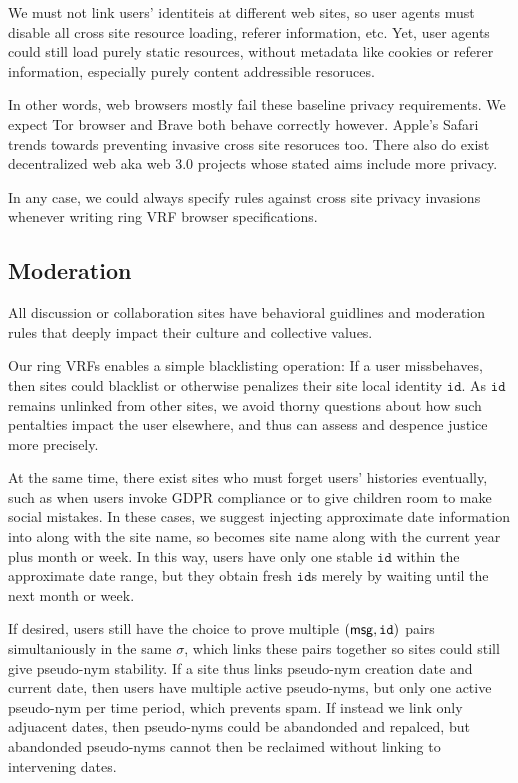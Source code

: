 We must not link users' identiteis at different web sites, so user agents
must disable all cross site resource loading, referer information, etc.
Yet, user agents could still load purely static resources, without metadata
like cookies or referer information, especially purely content addressible
resoruces.

In other words, web browsers mostly fail these baseline privacy requirements.
We expect Tor browser and Brave both behave correctly however.
Apple's Safari trends towards preventing invasive cross site resoruces too.  
There also do exist decentralized web aka web 3.0 projects whose stated aims
include more privacy.

In any case, we could always specify rules against cross site privacy invasions
whenever writing ring VRF browser specifications.


\subsection{Moderation}
\label{subsec:moderation}

All discussion or collaboration sites have behavioral guidlines and
moderation rules that deeply impact their culture and collective values.

Our ring VRFs enables a simple blacklisting operation:
If a user missbehaves, then sites could blacklist or otherwise penalizes
their site local identity $\mathtt{id}$.
As $\mathtt{id}$ remains unlinked from other sites, we avoid thorny
questions about how such pentalties impact the user elsewhere, and thus
can assess and despence justice more precisely. 

At the same time, there exist sites who must forget users' histories
eventually, such as when users invoke GDPR compliance or to give children
room to make social mistakes.  In these cases, we suggest injecting
approximate date information into \msg along with the site name,
so \msg becomes site name along with the current year plus month or week.
In this way, users have only one stable $\mathtt{id}$ within the
approximate date range, but they obtain fresh $\mathtt{id}$s merely
by waiting until the next month or week.

If desired, users still have the choice to prove multiple $(\mathsf{msg},\mathtt{id})$
pairs simultaniously in the same $\sigma$, which links these pairs
together so sites could still give pseudo-nym stability.
If a site thus links pseudo-nym creation date and current date, then
users have multiple active pseudo-nyms, but only one active pseudo-nym
per time period, which prevents spam.  If instead we link only adjuacent
dates, then pseudo-nyms could be abandonded and repalced, but abandonded
pseudo-nyms cannot then be reclaimed without linking to intervening dates.

